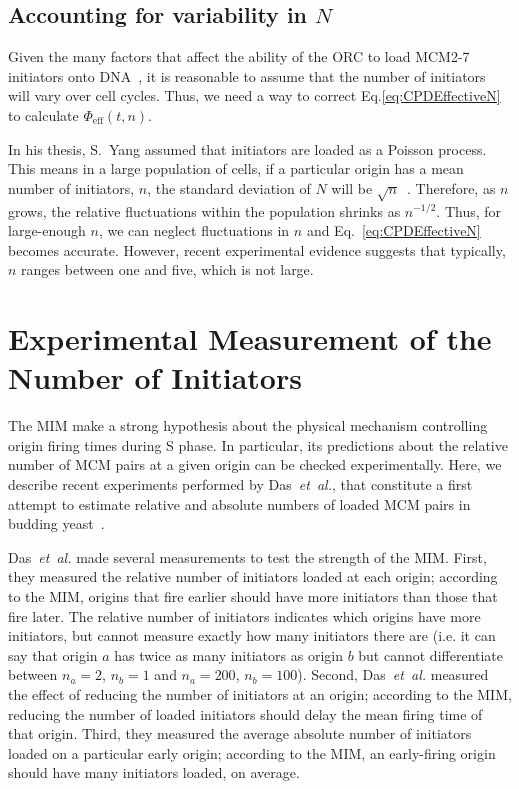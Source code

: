 {		
		\subsection{Accounting for variability in $N$}
		\label{subsec:VariableN}
		
		Given the many factors that affect the ability of the ORC to load MCM2-7 initiators onto DNA~\cite{MultiMCM}, it is reasonable to assume that the number of initiators will vary over cell cycles.
		Thus, we need a way to correct Eq.\ref{eq:CPDEffectiveN} to calculate $\Phi_\text{eff}(t,n)$.
		
		In his thesis, S.~Yang assumed that initiators are loaded as a Poisson process.
		This means in a large population of cells, if a particular origin has a mean number of initiators, $n$, the standard deviation of $N$ will be $\sqrt{n}$~\cite{cowan}.
		Therefore, as $n$ grows, the relative fluctuations within the population shrinks as $n^{-1/2}$.
		Thus, for large-enough $n$, we can neglect fluctuations in $n$ and Eq.~\ref{eq:CPDEffectiveN} becomes accurate.
		However, recent experimental evidence suggests that typically, $n$ ranges between one and five, which is not large.
		
	\section{Experimental Measurement of the Number of Initiators}
	\label{sec:ExperimentsMIM}
	
	The MIM make a strong hypothesis about the physical mechanism controlling origin firing times during S phase.
	In particular, its predictions about the relative number of MCM pairs at a given origin can be checked experimentally.
	Here, we describe recent experiments performed by Das~\emph{et~al.}, that constitute a first attempt to estimate relative and absolute numbers of loaded MCM pairs in budding yeast~\cite{Rhind}.
	
	Das~\emph{et~al.} made several measurements to test the strength of the MIM.
	First, they measured the relative number of initiators loaded at each origin; according to the MIM, origins that fire earlier should have more initiators than those that fire later.
	The relative number of initiators indicates which origins have more initiators, but cannot measure exactly how many initiators there are (i.e. it can say that origin $a$ has twice as many initiators as origin $b$ but cannot differentiate between $n_a=2$, $n_b=1$ and $n_a=200$, $n_b=100$).
	Second, Das~\emph{et~al.} measured the effect of reducing the number of initiators at an origin; according to the MIM, reducing the number of loaded initiators should delay the mean firing time of that origin.
	Third, they measured the average absolute number of initiators loaded on a particular early origin; according to the MIM, an early-firing origin should have many initiators loaded, on average.
		
}
